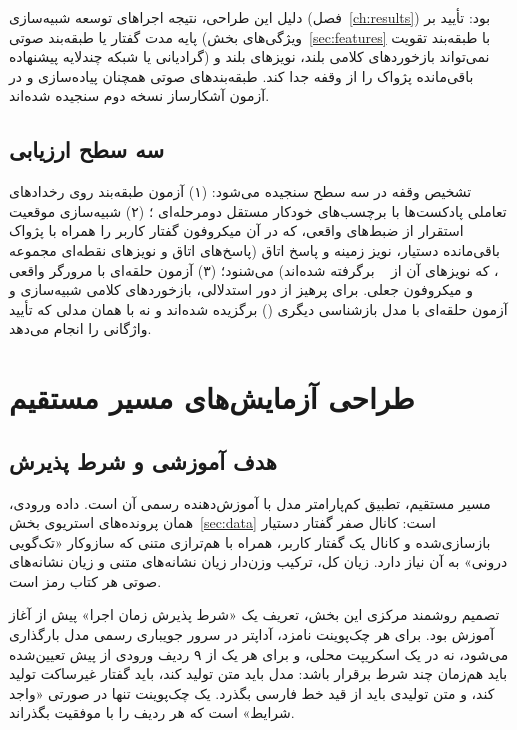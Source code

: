 دلیل این طراحی، نتیجه اجراهای توسعه شبیه‌سازی (فصل~\ref{ch:results}) بود:
تأیید بر پایه مدت گفتار یا طبقه‌بند صوتی (ویژگی‌های بخش~\ref{sec:features}
با طبقه‌بند تقویت گرادیانی یا شبکه چندلایه پیشنهاده) نمی‌تواند بازخوردهای
کلامی بلند، نویزهای بلند و باقی‌مانده پژواک را از وقفه جدا کند. طبقه‌بندهای
صوتی همچنان پیاده‌سازی و در آزمون آشکارساز نسخه دوم سنجیده شده‌اند.

\subsection{سه سطح ارزیابی}

تشخیص وقفه در سه سطح سنجیده می‌شود: (۱) آزمون طبقه‌بند روی رخدادهای
تعاملی پادکست‌ها با برچسب‌های خودکار مستقل دومرحله‌ای ؛
(۲) شبیه‌سازی موقعیت استقرار از ضبط‌های واقعی، که در آن میکروفون گفتار
کاربر را همراه با پژواک باقی‌مانده دستیار، نویز زمینه و پاسخ اتاق
(پاسخ‌های اتاق و نویزهای نقطه‌ای مجموعه ~\cite{ko2017rir}، که
نویزهای آن از ~\cite{snyder2015musan} برگرفته شده‌اند) می‌شنود؛
(۳) آزمون حلقه‌ای با مرورگر واقعی و میکروفون جعلی. برای پرهیز از دور
استدلالی، بازخوردهای کلامی شبیه‌سازی و آزمون حلقه‌ای با مدل بازشناسی دیگری
() برگزیده شده‌اند و نه با همان مدلی که تأیید واژگانی را
انجام می‌دهد.

\section{طراحی آزمایش‌های مسیر مستقیم}
\label{sec:direct}

\subsection{هدف آموزشی و شرط پذیرش}

مسیر مستقیم، تطبیق کم‌پارامتر مدل  با آموزش‌دهنده رسمی آن است.
داده ورودی، همان پرونده‌های استریوی بخش~\ref{sec:data} است: کانال صفر
گفتار دستیار بازسازی‌شده و کانال یک گفتار کاربر، همراه با هم‌ترازی متنی
که سازوکار «تک‌گویی درونی» به آن نیاز دارد. زیان کل، ترکیب وزن‌دار زیان
نشانه‌های متنی و زیان نشانه‌های صوتی هر کتاب رمز است.

تصمیم روشمند مرکزی این بخش، تعریف یک «شرط پذیرش زمان اجرا» پیش از
آغاز آموزش بود. برای هر چک‌پوینت نامزد، آداپتر در سرور جویباری رسمی مدل
بارگذاری می‌شود، نه در یک اسکریپت محلی، و برای هر یک از ۹ ردیف ورودی از
پیش تعیین‌شده باید هم‌زمان چند شرط برقرار باشد: مدل باید متن تولید کند،
باید گفتار غیرساکت تولید کند، و متن تولیدی باید از قید خط فارسی بگذرد. یک
چک‌پوینت تنها در صورتی «واجد شرایط» است که هر  ردیف را با موفقیت
بگذراند.

